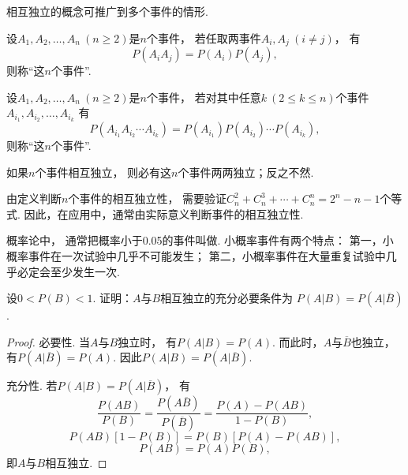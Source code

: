 相互独立的概念可推广到多个事件的情形.
\begin{definition}
设\(A_1,A_2,\dotsc,A_n\ (n \geq 2)\)是\(n\)个事件，
若任取两事件\(A_i,A_j\ (i \neq j)\)，
有\begin{equation*}
	P(A_i A_j) = P(A_i) P(A_j),
\end{equation*}
则称“这\(n\)个事件”.
\end{definition}

\begin{definition}
设\(A_1,A_2,\dotsc,A_n\ (n \geq 2)\)是\(n\)个事件，
若对其中任意\(k\ (2 \leq k \leq n)\)个事件\(A_{i_1},A_{i_2},\dotsc,A_{i_k}\)
有\begin{equation*}
	P(A_{i_1} A_{i_2} \dotsm A_{i_k})
	= P(A_{i_1}) P(A_{i_2}) \dotsm P(A_{i_k}),
\end{equation*}
则称“这\(n\)个事件”.
\end{definition}

\begin{theorem}
如果\(n\)个事件相互独立，
则必有这\(n\)个事件两两独立；反之不然.
\end{theorem}

由定义判断\(n\)个事件的相互独立性，
需要验证\(C_n^2+C_n^3+\dotsb+C_n^n=2^n-n-1\)个等式.
因此，在应用中，通常由实际意义判断事件的相互独立性.

概率论中，
通常把概率小于0.05的事件叫做.
小概率事件有两个特点：
第一，小概率事件在一次试验中几乎不可能发生；
第二，小概率事件在大量重复试验中几乎必定会至少发生一次.

\begin{example}
设\(0<P(B)<1\).
证明：\(A\)与\(B\)相互独立的充分必要条件为
\(P(A \vert B) = P(A \vert \overline{B})\).
\begin{proof}
必要性.
当\(A\)与\(B\)独立时，
有\(P(A \vert B) = P(A)\).
而此时，\(A\)与\(\overline{B}\)也独立，
有\(P(A \vert \overline{B}) = P(A)\).
因此\(P(A \vert B) = P(A \vert \overline{B})\).

充分性.
若\(P(A \vert B) = P(A \vert \overline{B})\)，
有\begin{equation*}
	\frac{P(AB)}{P(B)}
	= \frac{P(A\overline{B})}{P(\overline{B})}
	= \frac{P(A)-P(AB)}{1-P(B)},
\end{equation*}\begin{equation*}
	P(AB) [1-P(B)] = P(B) [P(A)-P(AB)],
\end{equation*}\begin{equation*}
	P(AB) = P(A) P(B),
\end{equation*}
即\(A\)与\(B\)相互独立.
\end{proof}
\end{example}

